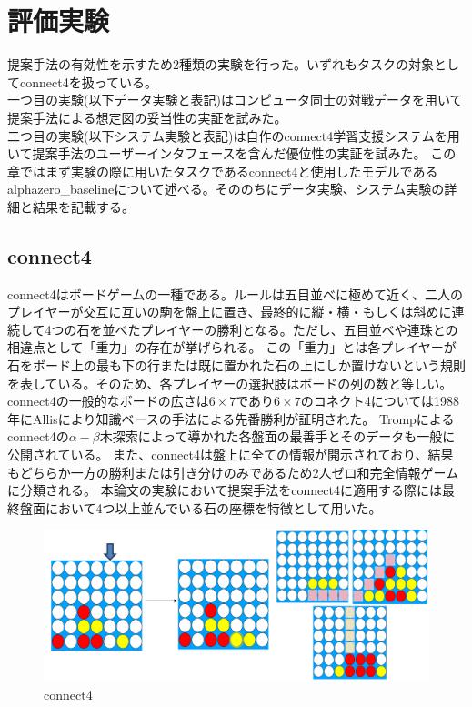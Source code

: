 \chapter{評価実験}
提案手法の有効性を示すため2種類の実験を行った。いずれもタスクの対象としてconnect4を扱っている。\\
一つ目の実験(以下データ実験と表記)はコンピュータ同士の対戦データを用いて提案手法による想定図の妥当性の実証を試みた。\\
二つ目の実験(以下システム実験と表記)は自作のconnect4学習支援システムを用いて提案手法のユーザーインタフェースを含んだ優位性の実証を試みた。
この章ではまず実験の際に用いたタスクであるconnect4と使用したモデルであるalphazero\_baselineについて述べる。そののちにデータ実験、システム実験の詳細と結果を記載する。
\section{connect4}
connect4\cite{connect4}はボードゲームの一種である。ルールは五目並べに極めて近く、二人のプレイヤーが交互に互いの駒を盤上に置き、最終的に縦・横・もしくは斜めに連続して4つの石を並べたプレイヤーの勝利となる。ただし、五目並べや連珠との相違点として「重力」の存在が挙げられる。
この「重力」とは各プレイヤーが石をボード上の最も下の行または既に置かれた石の上にしか置けないという規則を表している。そのため、各プレイヤーの選択肢はボードの列の数と等しい。
connect4の一般的なボードの広さは$6\times7$であり$6\times7$のコネクト4については1988年にAllis\cite{allis}により知識ベースの手法による先番勝利が証明された。
Tromp\cite{data}によるconnect4の$\alpha-\beta$木探索によって導かれた各盤面の最善手とそのデータも一般に公開されている。
また、connect4は盤上に全ての情報が開示されており、結果もどちらか一方の勝利または引き分けのみであるため2人ゼロ和完全情報ゲームに分類される。
本論文の実験において提案手法をconnect4に適用する際には最終盤面において4つ以上並んでいる石の座標を特徴として用いた。
\begin{figure}[t]
	\centering
    \includegraphics[width=\linewidth]{./figure/connect4.png}
	\caption{connect4}
	\label{fig:connect4}
\end{figure}
